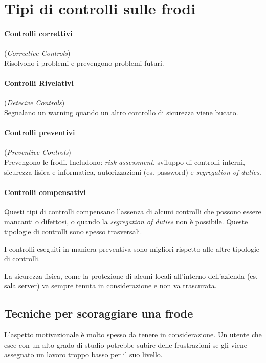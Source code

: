\section{Tipi di controlli sulle frodi}


\paragraph*{Controlli correttivi} (\textit{Corrective Controls})\\
Risolvono i problemi e prevengono problemi futuri.

\paragraph*{Controlli Rivelativi} (\textit{Detecive Controls})\\
Segnalano un warning quando un altro controllo di sicurezza viene bucato.

\paragraph*{Controlli preventivi} (\textit{Preventive Controls})\\
Prevengono le frodi. Includono: \textit{risk assessment}, sviluppo di controlli interni, 
sicurezza fisica e informatica, autorizzazioni (es. password) e \textit{segregation of 
duties}.

\paragraph*{Controlli compensativi}
Questi tipi di controlli compensano l'assenza di alcuni controlli che possono
essere mancanti o difettosi, o quando la \textit{segregation of duties} non è
possibile. Queste tipologie di controlli sono spesso trasversali.

\par I controlli eseguiti in maniera preventiva sono migliori rispetto alle
altre tipologie di controlli.

La sicurezza fisica, come la protezione di alcuni locali all'interno
dell'azienda (es. sala server) va sempre tenuta in
considerazione e non va trascurata.

\subsection{Tecniche per scoraggiare una frode}

L'aspetto motivazionale è molto spesso da tenere in considerazione.
Un utente che esce con un alto grado di studio potrebbe subire delle
frustrazioni se gli viene assegnato un lavoro troppo basso per il suo livello.

